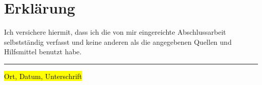 \chapter*{Erklärung}
\thispagestyle{empty}
\vspace{1cm}

Ich versichere hiermit, dass ich die von mir eingereichte Abschlussarbeit selbstständig verfasst und 
keine anderen als die angegebenen Quellen und Hilfsmittel benutzt habe.

\vspace{2cm}


\noindent\rule{\textwidth}{0.5pt}
\vspace{2cm}
\hl{Ort, Datum, Unterschrift}